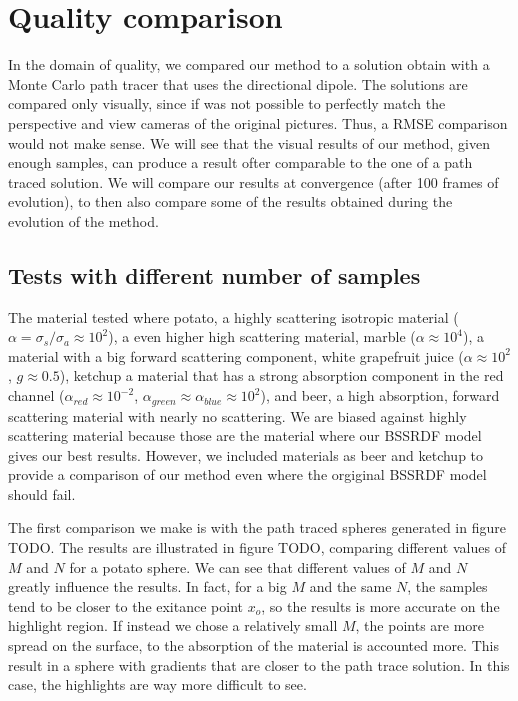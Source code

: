 \section{Quality comparison}

In the domain of quality, we compared our method to a solution obtain with a Monte Carlo path tracer that uses the directional dipole. The solutions are compared only visually, since if was not possible to perfectly match the perspective and view cameras of the original pictures. Thus, a RMSE comparison would not make sense.  We will see that the visual results of our method, given enough samples, can produce a result ofter comparable to the one of a path traced solution. We will compare our results at convergence (after 100 frames of evolution), to then also compare some of the results obtained during the evolution of the method. 

\subsection{Tests with different number of samples}

The material tested where potato, a highly scattering isotropic material ($\alpha = \sigma_s / \sigma_a \approx 10^2$), a even higher high scattering material, marble ($\alpha \approx 10^4$), a material with a big forward scattering component, white grapefruit juice ($\alpha \approx 10^2$, $g \approx 0.5$), ketchup a material that has a strong absorption component in the red channel ($\alpha_{red} \approx 10^{-2}$, $\alpha_{green} \approx \alpha_{blue} \approx 10^2$), and beer, a high absorption, forward scattering material with nearly no scattering. We are biased against highly scattering material because those are the material where our BSSRDF model gives our best results. However, we included materials as beer and ketchup to provide a comparison of our method even where the orgiginal BSSRDF model should fail.

The first comparison we make is with the path traced spheres generated in figure TODO. The results are illustrated in figure TODO, comparing different values of $M$ and $N$ for a potato sphere. We can see that different values of $M$ and $N$ greatly influence the results. In fact, for a big $M$ and the same $N$, the samples tend to be closer to the exitance point $x_o$, so the results is more accurate on the highlight region. If instead we chose a relatively small $M$, the points are more spread on the surface, to the absorption of the material is accounted more. This result in a sphere with gradients that are closer to the path trace solution. In this case, the highlights are way more difficult to see. 


